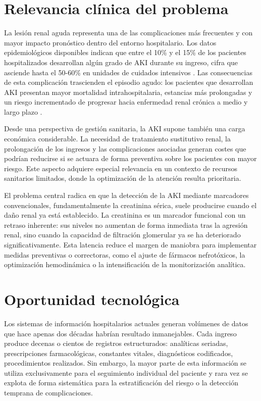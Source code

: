 \documentclass[12pt, a4paper, oneside]{report}
\begin{document}
\section{Relevancia clínica del problema}
\label{sec:relevancia}
La lesión renal aguda representa una de las complicaciones más frecuentes y con mayor impacto pronóstico dentro del entorno hospitalario. Los datos epidemiológicos disponibles indican que entre el 10\% y el 15\% de los pacientes hospitalizados desarrollan algún grado de AKI durante su ingreso, cifra que asciende hasta el 50-60\% en unidades de cuidados intensivos \parencite{hoste2018epidemiology, hoste2015akiepi}. Las consecuencias de esta complicación trascienden el episodio agudo: los pacientes que desarrollan AKI presentan mayor mortalidad intrahospitalaria, estancias más prolongadas y un riesgo incrementado de progresar hacia enfermedad renal crónica a medio y largo plazo \parencite{chawla2014akickd}.

Desde una perspectiva de gestión sanitaria, la AKI supone también una carga económica considerable. La necesidad de tratamiento sustitutivo renal, la prolongación de los ingresos y las complicaciones asociadas generan costes que podrían reducirse si se actuara de forma preventiva sobre los pacientes con mayor riesgo. Este aspecto adquiere especial relevancia en un contexto de recursos sanitarios limitados, donde la optimización de la atención resulta prioritaria.

El problema central radica en que la detección de la AKI mediante marcadores convencionales, fundamentalmente la creatinina sérica, suele producirse cuando el daño renal ya está establecido. La creatinina es un marcador funcional con un retraso inherente: sus niveles no aumentan de forma inmediata tras la agresión renal, sino cuando la capacidad de filtración glomerular ya se ha deteriorado significativamente. Esta latencia reduce el margen de maniobra para implementar medidas preventivas o correctoras, como el ajuste de fármacos nefrotóxicos, la optimización hemodinámica o la intensificación de la monitorización analítica.

\section{Oportunidad tecnológica}
\label{sec:oportunidad}
Los sistemas de información hospitalarios actuales generan volúmenes de datos que hace apenas dos décadas habrían resultado inmanejables. Cada ingreso produce decenas o cientos de registros estructurados: analíticas seriadas, prescripciones farmacológicas, constantes vitales, diagnósticos codificados, procedimientos realizados. Sin embargo, la mayor parte de esta información se utiliza exclusivamente para el seguimiento individual del paciente y rara vez se explota de forma sistemática para la estratificación del riesgo o la detección temprana de complicaciones.
\end{document}
